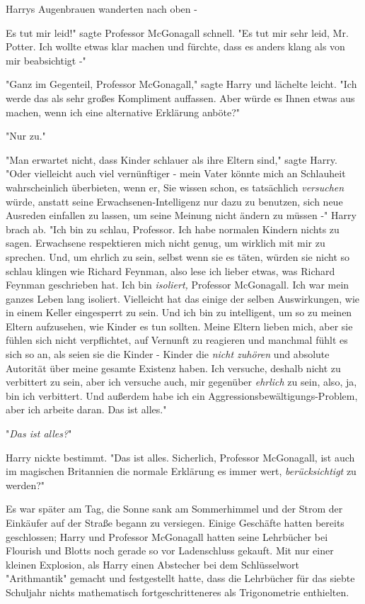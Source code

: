 {Harrys Augenbrauen wanderten nach oben -

Es tut mir leid!" sagte Professor McGonagall schnell. "Es tut mir sehr leid, Mr. Potter. Ich wollte etwas klar machen und fürchte, dass es anders klang als von mir beabsichtigt -"

"Ganz im Gegenteil, Professor McGonagall," sagte Harry und lächelte leicht. "Ich werde das als sehr großes Kompliment auffassen. Aber würde es Ihnen etwas aus machen, wenn ich eine alternative Erklärung anböte?"

"Nur zu."

"Man erwartet nicht, dass Kinder schlauer als ihre Eltern sind," sagte Harry. "Oder vielleicht auch viel vernünftiger - mein Vater könnte mich an Schlauheit wahrscheinlich überbieten, wenn er, Sie wissen schon, es tatsächlich \emph{versuchen} würde, anstatt seine Erwachsenen-Intelligenz nur dazu zu benutzen, sich neue Ausreden einfallen zu lassen, um seine Meinung nicht ändern zu müssen -" Harry brach ab. "Ich bin zu schlau, Professor. Ich habe normalen Kindern nichts zu sagen. Erwachsene respektieren mich nicht genug, um wirklich mit mir zu sprechen. Und, um ehrlich zu sein, selbst wenn sie es täten, würden sie nicht so schlau klingen wie Richard Feynman, also lese ich lieber etwas, was Richard Feynman geschrieben hat. Ich bin \emph{isoliert,} Professor McGonagall. Ich war mein ganzes Leben lang isoliert. Vielleicht hat das einige der selben Auswirkungen, wie in einem Keller eingesperrt zu sein. Und ich bin zu intelligent, um so zu meinen Eltern aufzusehen, wie Kinder es tun sollten. Meine Eltern lieben mich, aber sie fühlen sich nicht verpflichtet, auf Vernunft zu reagieren und manchmal fühlt es sich so an, als seien sie die Kinder - Kinder die \emph{nicht zuhören} und absolute Autorität über meine gesamte Existenz haben. Ich versuche, deshalb nicht zu verbittert zu sein, aber ich versuche auch, mir gegenüber \emph{ehrlich} zu sein, also, ja, bin ich verbittert. Und außerdem habe ich ein Aggressionsbewältigungs-Problem, aber ich arbeite daran. Das ist alles."

"\emph{Das ist alles?}"

Harry nickte bestimmt. "Das ist alles. Sicherlich, Professor McGonagall, ist auch im magischen Britannien die normale Erklärung es immer wert, \emph{berücksichtigt} zu werden?"

\later

Es war später am Tag, die Sonne sank am Sommerhimmel und der Strom der Einkäufer auf der Straße begann zu versiegen. Einige Geschäfte hatten bereits geschlossen; Harry und Professor McGonagall hatten seine Lehrbücher bei Flourish und Blotts noch gerade so vor Ladenschluss gekauft. Mit nur einer kleinen Explosion, als Harry einen Abstecher bei dem Schlüsselwort "Arithmantik" gemacht und festgestellt hatte, dass die Lehrbücher für das siebte Schuljahr nichts mathematisch fortgeschritteneres als Trigonometrie enthielten.

}
